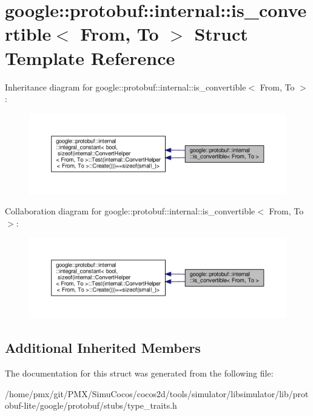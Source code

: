 \hypertarget{structgoogle_1_1protobuf_1_1internal_1_1is__convertible}{}\section{google\+:\+:protobuf\+:\+:internal\+:\+:is\+\_\+convertible$<$ From, To $>$ Struct Template Reference}
\label{structgoogle_1_1protobuf_1_1internal_1_1is__convertible}


Inheritance diagram for google\+:\+:protobuf\+:\+:internal\+:\+:is\+\_\+convertible$<$ From, To $>$\+:
\nopagebreak
\begin{figure}[H]
\begin{center}
\leavevmode
\includegraphics[width=350pt]{structgoogle_1_1protobuf_1_1internal_1_1is__convertible__inherit__graph}
\end{center}
\end{figure}


Collaboration diagram for google\+:\+:protobuf\+:\+:internal\+:\+:is\+\_\+convertible$<$ From, To $>$\+:
\nopagebreak
\begin{figure}[H]
\begin{center}
\leavevmode
\includegraphics[width=350pt]{structgoogle_1_1protobuf_1_1internal_1_1is__convertible__coll__graph}
\end{center}
\end{figure}
\subsection*{Additional Inherited Members}


The documentation for this struct was generated from the following file\+:\begin{DoxyCompactItemize}
\item 
/home/pmx/git/\+P\+M\+X/\+Simu\+Cocos/cocos2d/tools/simulator/libsimulator/lib/protobuf-\/lite/google/protobuf/stubs/type\+\_\+traits.\+h\end{DoxyCompactItemize}
